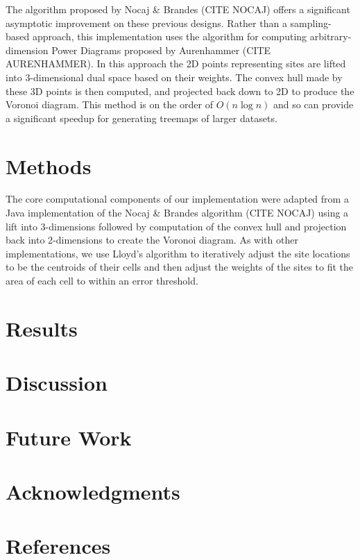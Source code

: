 \documentclass{acm_proc_article-sp}
\begin{document}
The algorithm proposed by Nocaj \& Brandes (CITE NOCAJ) offers a
significant asymptotic improvement on these previous designs. Rather
than a sampling-based approach, this implementation uses the algorithm
for computing arbitrary-dimension Power Diagrams proposed by
Aurenhammer (CITE AURENHAMMER). In this approach the 2D points
representing sites are lifted into 3-dimensional dual space based on
their weights. The convex hull made by these 3D points is then
computed, and projected back down to 2D to produce the Voronoi
diagram. This method is on the order of $O(n \log n)$ and so can
provide a significant speedup for generating treemaps of larger
datasets. 

\section{Methods}
The core computational components of our implementation were adapted
from a Java implementation of the Nocaj \& Brandes algorithm (CITE
NOCAJ) using a lift into 3-dimensions followed by computation of
the convex hull and projection back into 2-dimensions to create the
Voronoi diagram. As with other implementations, we use Lloyd's
algorithm to iteratively adjust the site locations to be the centroids
of their cells and then adjust the weights of the sites to fit the
area of each cell to within an error threshold.


\section{Results}


\section{Discussion}


\section{Future Work}


\section{Acknowledgments}


\section{References}
\end{document}
